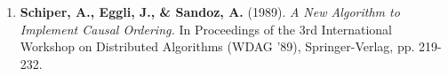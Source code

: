 \begin{enumerate}
    \item \textbf{Schiper, A., Eggli, J., \& Sandoz, A.} (1989). 
    \textit{A New Algorithm to Implement Causal Ordering.} 
    In Proceedings of the 3rd International Workshop on Distributed Algorithms (WDAG '89), 
    Springer-Verlag, pp. 219-232.
\end{enumerate}